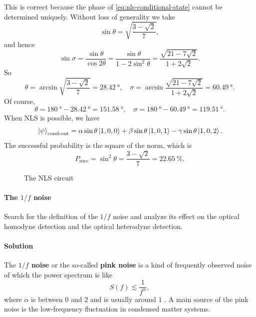 \documentclass[hyperref, a4paper]{article}
\newcommand*{\concept}[1]{{\textbf{#1}}}
\begin{document}
\begin{itemize}
    This is correct because the phase of \eqref{eq:nls-conditional-state} cannot be determined uniquely.
    Without loss of generality we take 
    \[
        \sin \theta = \sqrt{\frac{3 - \sqrt{2}}{7}},
    \]
    and hence 
    \[
        \sin \sigma = \frac{\sin \theta}{\cos 2 \theta} = \frac{\sin \theta}{1 - 2 \sin^2 \theta} = \frac{\sqrt{21 - 7 \sqrt{2}}}{1 + 2 \sqrt{2}}.
    \]
    So 
    \begin{equation}
        \theta = \arcsin \sqrt{\frac{3 - \sqrt{2}}{7}} = \SI{28.42}{\degree}, \quad \sigma = \arcsin \frac{\sqrt{21 - 7 \sqrt{2}}}{1 + 2 \sqrt{2}} = \SI{60.49}{\degree}.
    \end{equation}
    Of course, 
    \begin{equation}
        \theta = \SI{180}{\degree} - \SI{28.42}{\degree} = \SI{151.58}{\degree}, \quad \sigma = \SI{180}{\degree} - \SI{60.49}{\degree} = \SI{119.51}{\degree}.
    \end{equation}
    When NLS is possible, we have 
    \[
        \ket*{\psi}_\text{cond-out} = \alpha \sin \theta \ket*{1, 0, 0} + \beta \sin \theta \ket*{1, 0, 1} - \gamma \sin \theta \ket*{1, 0, 2}.
    \]
    The successful probability is the square of the norm, which is 
    \begin{equation}
        P_\text{succ} = \sin^2 \theta = \frac{3 - \sqrt{2}}{7} = \SI{22.65}{\percent}.
    \end{equation}
\end{itemize}

\begin{figure}
    \centering
    
    \caption{The NLS circuit}
    \label{fig:nls}
\end{figure}

\paragraph{}

\paragraph{The $1/f$ noise} Search for the definition of the $1/f$ noise and analyze its effect on the optical homodyne detection and the optical heterodyne detection.

\paragraph{Solution} The \concept{$1/f$ noise} or the so-called \concept{pink noise} is a kind of frequently observed noise of which the power spectrum is like
\[
    S(f) \lesssim \frac{1}{f^\alpha}, 
\]
where $\alpha$ is between $0$ and $2$ and is usually around $1$ \cite{PinknoiseWikipedia}.
A main source of the pink noise is the low-frequency fluctuation in condensed matter systems.
\end{document}
